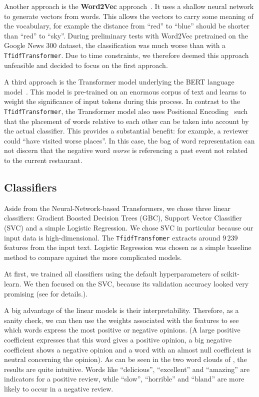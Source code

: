 \documentclass[11pt]{article}
\begin{document}
Another approach is the \textbf{Word2Vec} approach~\cite{mikolov_efficient_2013}.
It uses a shallow neural network to generate vectors from words.
This allows the vectors to carry some meaning of the vocabulary, for example the distance from ``red'' to ``blue'' should be shorter than ``red'' to ``sky''.
During preliminary tests with Word2Vec pretrained on the Google News 300 dataset, the classification was much worse than with a \texttt{TfidfTransformer}.
Due to time constraints, we therefore deemed this approach unfeasible and decided to focus on the first approach.

A third approach is the Transformer model underlying the BERT language model~\cite{devlin2018bert}.
This model is pre-trained on an enormous corpus of text and learns to weight the significance of input tokens during this process.
In contrast to the \texttt{TfidfTransformer}, the Transformer model also uses Positional Encoding~\cite{vaswani_attention_nodate} such that the placement of words relative to each other can be taken into account by the actual classifier. This provides a substantial benefit: for example, a reviewer could “have visited worse places”. In this case, the bag of word representation can not discern that the negative word \textit{worse} is referencing a past event not related to the current restaurant.


\subsection{Classifiers}
Aside from the Neural-Network-based Transformers, we chose three linear classifiers: Gradient Boosted Decision Trees (GBC), Support Vector Classifier (SVC) and a simple Logistic Regression.
We chose SVC in particular because our input data is high-dimensional. The \texttt{TfidfTransfomer} extracts around $9\,239$ features from the input text.
Logistic Regression was chosen as a simple baseline method to compare against the more complicated models.

At first, we trained all classifiers using the default hyperparameters of scikit-learn.
We then focused on the SVC, because its validation accuracy looked very promising (see  for details.).

A big advantage of the linear models is their interpretability.
Therefore, as a sanity check, we can then use the weights associated with the features to see which words express the most positive or negative opinions.
 (A large positive coefficient expresses that this word gives a positive opinion, a big negative coefficient shows a
 negative opinion and a word with an almost null coefficient is neutral concerning the opinion).
 As can be seen in the two word clouds of , the results are quite intuitive. Words like “delicious”, “excellent” and “amazing” are indicators for a positive review, while “slow”, “horrible” and “bland” are more likely to occur in a negative review.
\end{document}
